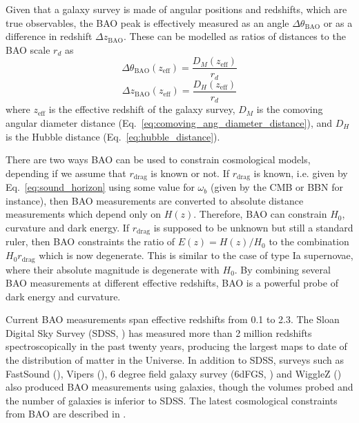     Given that a galaxy survey is made of angular positions and redshifts, 
    which are true observables, 
    the BAO peak is effectively measured as an angle $\Delta \theta_\mathrm{BAO}$ 
    or as a difference in redshift $\Delta z_\mathrm{BAO}$. 
    These can be modelled as ratios of distances to the BAO scale $r_d$ as
    \begin{equation}
        \Delta \theta_\mathrm{BAO}(z_\mathrm{eff}) = \frac{D_M(z_\mathrm{eff})}{r_d}
        \label{eq:bao_angular}
    \end{equation}
    \begin{equation}
        \Delta z_\mathrm{BAO}(z_\mathrm{eff}) = \frac{D_H(z_\mathrm{eff})}{r_d}
        \label{eq:bao_radial}
    \end{equation}
    where $z_\mathrm{eff}$ is the effective redshift of the galaxy survey, 
    $D_M$ is the comoving angular diameter distance (Eq.~\ref{eq:comoving_ang_diameter_distance}),
    and $D_H$ is the Hubble distance (Eq.~\ref{eq:hubble_distance}). 

    There are two ways BAO can be used to constrain cosmological models, 
    depending if we assume that $r_\mathrm{drag}$ is known or not. 
    If $r_\mathrm{drag}$ is known, i.e. given by Eq.~\ref{eq:sound_horizon} 
    using some value for $\omega_b$
    (given by the CMB or BBN for instance), then BAO measurements
    are converted to absolute distance measurements which depend only on  
    $H(z)$. Therefore, BAO can constrain $H_0$, curvature and dark energy. 
    If $r_\mathrm{drag}$ is supposed to be unknown but still a standard ruler, 
    then BAO constraints the ratio of $E(z) = H(z)/H_0$ to the combination 
    $H_0 r_\mathrm{drag}$ which is now degenerate. This is similar to the case of
    type Ia supernovae, where their absolute magnitude is degenerate with $H_0$.
    By combining several BAO measurements at different effective redshifts, 
    BAO is a powerful probe of dark energy and curvature. 

    Current BAO measurements span effective redshifts from 0.1 to 2.3.
    The Sloan Digital Sky Survey (SDSS, 
    \cite{eisensteinSDSSIIIMassiveSpectroscopic2011, blantonSloanDigitalSky2017}) 
    has measured more than 2 million 
    redshifts spectroscopically in the past twenty years, 
    producing the largest maps to date of the
    distribution of matter in the Universe. In addition to SDSS, 
    surveys such as FastSound (\cite{okumuraSubaruFMOSGalaxy2016}), 
    Vipers (\cite{pezzottaVIMOSPublicExtragalactic2017}),
    6 degree field galaxy survey (6dFGS, \cite{beutler6dFGalaxySurvey2012a})
    and WiggleZ (\cite{parkinsonWiggleZDarkEnergy2012}) also
    produced BAO measurements using galaxies, though the volumes 
    probed and the number of galaxies is inferior to SDSS. 
    The latest cosmological constraints from BAO are described in 
    \cite{alamCompletedSDSSIVExtended2021}.



